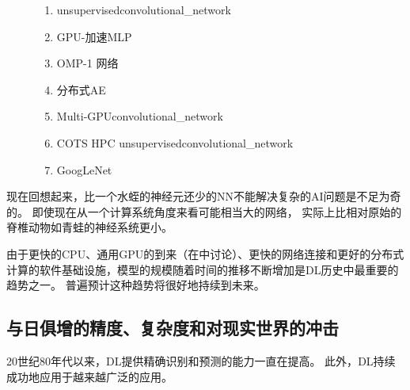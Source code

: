 \begin{figure}[!htb]
{\begin{enumerate}
  \item %
    \gls{unsupervised}\gls{convolutional_network}~\citep{Jarrett-ICCV2009-small}
  \item %
    GPU-加速\gls{MLP}~\citep{Ciresan-2010}
  \item %
    OMP-1 网络~\citep{Coates2011b}
  \item %
    分布式\gls{AE}~\citep{QuocLe-ICML2012}
  \item %
    Multi-GPU\gls{convolutional_network}~\citep{Krizhevsky-2012-small}
  \item %
    COTS HPC \gls{unsupervised}\gls{convolutional_network}~\citep{icml2013_coates13}
  \item %
    GoogLeNet~\citep{Szegedy-et-al-arxiv2014}
\end{enumerate}
}
\end{figure}


现在回想起来，比一个水蛭的神经元还少的\gls{NN}不能解决复杂的\gls{AI}问题是不足为奇的。
即使现在从一个计算系统角度来看可能相当大的网络， 实际上比相对原始的脊椎动物如青蛙的神经系统更小。

由于更快的CPU、通用GPU的到来（在中讨论）、更快的网络连接和更好的分布式计算的软件基础设施，模型的规模随着时间的推移不断增加是\gls{DL}历史中最重要的趋势之一。
普遍预计这种趋势将很好地持续到未来。


\subsection{与日俱增的精度、复杂度和对现实世界的冲击}
\label{sec:increasing_accuracy_complexity_and_real_world_impact}

20世纪80年代以来，\gls{DL}提供精确识别和预测的能力一直在提高。
此外，\gls{DL}持续成功地应用于越来越广泛的应用。

